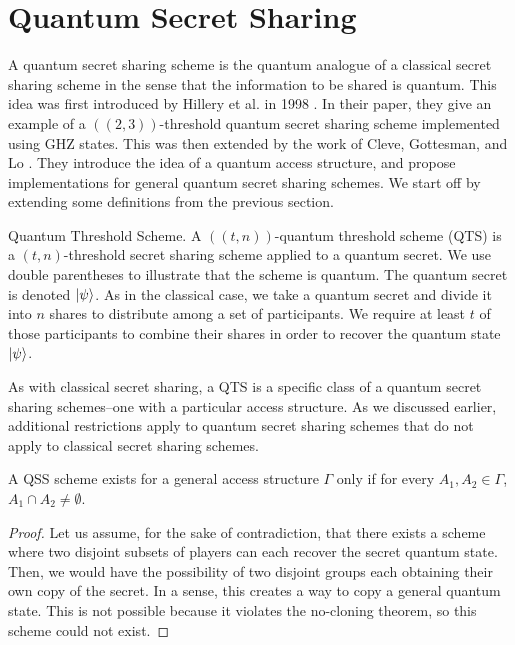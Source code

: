 \section{Quantum Secret Sharing}
\label{section:qss}

A quantum secret sharing scheme is the quantum analogue of a classical secret sharing scheme in the sense that the information to be shared is quantum. This idea was first introduced by Hillery et al. in 1998 \cite{hillery_quantum_1999}. In their paper, they give an example of a $((2,3))$-threshold quantum secret sharing scheme implemented using GHZ states. This was then extended by the work of Cleve, Gottesman, and Lo \cite{cleve_how_1999}. They introduce the idea of a quantum access structure, and propose implementations for general quantum secret sharing schemes. We start off by extending some definitions from the previous section.

\begin{definition}{Quantum Threshold Scheme.}
    \label{defn:qts}
    A $((t,n))$-quantum threshold scheme (QTS) is a $(t,n)$-threshold secret sharing scheme applied to a quantum secret. We use double parentheses to illustrate that the scheme is quantum. The quantum secret is denoted $\ket{\psi}$. As in the classical case, we take a quantum secret and divide it into $n$ shares to distribute among a set of participants. We require at least $t$ of those participants to combine their shares in order to recover the quantum state $\ket{\psi}$.
\end{definition}

As with classical secret sharing, a QTS is a specific class of a quantum secret sharing schemes--one with a particular access structure. As we discussed earlier, additional restrictions apply to quantum secret sharing schemes that do not apply to classical secret sharing schemes.

\begin{theorem}
    \label{thm:qss-disjoint}
    A QSS scheme exists for a general access structure $\Gamma$ only if for every $A_1, A_2 \in \Gamma$, $A_1 \cap A_2 \neq \emptyset$.
\end{theorem}

\begin{proof}
    Let us assume, for the sake of contradiction, that there exists a scheme where two disjoint subsets of players can each recover the secret quantum state. Then, we would have the possibility of two disjoint groups each obtaining their own copy of the secret. In a sense, this creates a way to copy a general quantum state. This is not possible because it violates the no-cloning theorem, so this scheme could not exist.
\end{proof}

